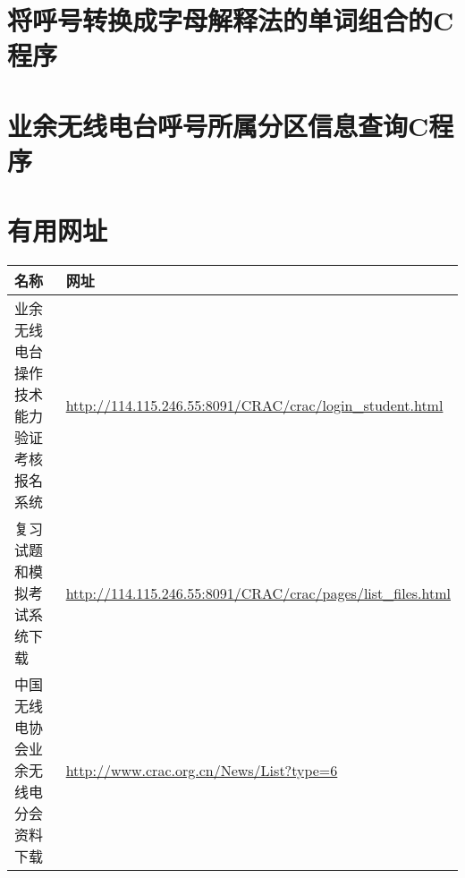 \section{将呼号转换成字母解释法的单词组合的C程序}



\newpage


\section{业余无线电台呼号所属分区信息查询C程序}



\newpage

\section{有用网址}

\begin{longtable}{|p{8cm}|p{8cm}|}
	\hline
	\textbf{名称} & \textbf{网址} \\
	\hline
	业余无线电台操作技术能力验证考核报名系统 & \url{http://114.115.246.55:8091/CRAC/crac/login_student.html} \\
	\hline
	复习试题和模拟考试系统下载 & \url{http://114.115.246.55:8091/CRAC/crac/pages/list_files.html} \\
	\hline
	中国无线电协会业余无线电分会资料下载 & \url{http://www.crac.org.cn/News/List?type=6} \\
	\hline
\end{longtable}
